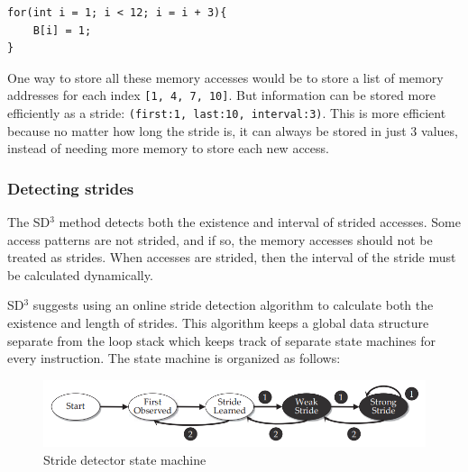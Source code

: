\documentclass[12pt,twoside]{reedthesis}
\begin{document}
		\begin{lstlisting}
for(int i = 1; i < 12; i = i + 3){
	B[i] = 1;
}
		\end{lstlisting}
		
%		
		One way to store all these memory accesses would be to store a list of memory addresses for each index \texttt{[1, 4, 7, 10]}.
		But information can be stored more efficiently as a stride: \texttt{(first:1, last:10, interval:3)}. This is more efficient because no matter how long the stride is, it can always be stored in just 3 values, instead of needing more memory to store each new access. 
		
		
		\subsubsection{Detecting strides}
		
		The SD$^3$ method detects both the existence and interval of strided accesses. 
		Some access patterns are not strided, and if so, the memory accesses should not be treated as strides. When accesses are strided, then the interval of the stride must be calculated dynamically.  
		
		SD$^3$ suggests using an online stride detection algorithm to calculate both the existence and length of strides.
		This algorithm keeps a global data structure separate from the loop stack which keeps track of separate state machines for every instruction. The state machine is organized as follows:
		
		\begin{figure}[h]
			\caption{Stride detector state machine}
			\label{fig:stride-detector}
			\includegraphics[scale=0.6]{stride-detector}
		\end{figure}
		
\end{document}
